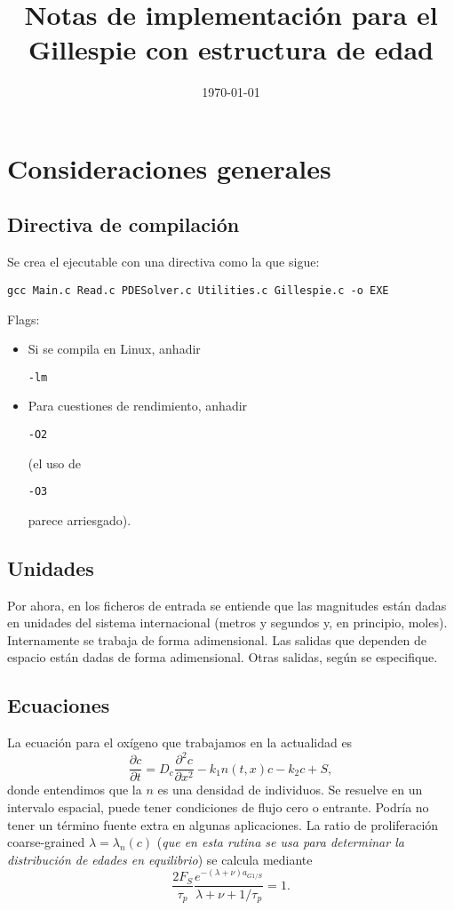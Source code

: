\documentclass[12pt]{article}
\numberwithin{equation}{section}
\begin{document}
\title{Notas de implementaci\'on para el Gillespie con estructura de edad}


\date{\today}
\maketitle


\section{Consideraciones generales}


\subsection{Directiva de compilaci\'on}
Se crea el ejecutable con una directiva como la que sigue: 
\begin{verbatim}
gcc Main.c Read.c PDESolver.c Utilities.c Gillespie.c -o EXE 
\end{verbatim}
%
Flags:
\begin{itemize}
\item Si se compila en Linux, anhadir \begin{verbatim}-lm\end{verbatim}
\item Para cuestiones de rendimiento, anhadir \begin{verbatim}-O2\end{verbatim} (el uso de \begin{verbatim}-O3\end{verbatim} parece arriesgado).
\end{itemize}
\subsection{Unidades}
Por ahora, en los ficheros de entrada se entiende que las magnitudes est\'an dadas en unidades del sistema internacional (metros y segundos y, en principio, moles). Internamente se trabaja de forma adimensional. Las salidas que dependen de espacio est\'an dadas de forma adimensional. Otras salidas, seg\'un se especifique.


\subsection{Ecuaciones}
La ecuaci\'on para el ox\'igeno que trabajamos en la actualidad es 
\begin{equation}
\label{eq:cdim}
 \frac{\partial c}{\partial t}=D_c \frac{\partial^2 c}{\partial x^2}-k_1 n(t,x)c
 -k_2c+S,
 \end{equation}
 donde entendimos que la $n$ es una densidad de individuos. Se resuelve en un intervalo espacial, puede tener condiciones de flujo cero o entrante. Podr\'ia no tener un t\'ermino fuente extra en algunas aplicaciones. La ratio de proliferaci\'on coarse-grained $\lambda=\lambda_n(c)$ ({\em que en esta rutina se usa para determinar la distribuci\'on de edades en equilibrio}) se calcula mediante
\begin{equation}
\label{eq:lambda}
 \frac{2 F_S}{\tau_p}\frac{e^{-\left(\lambda+\nu\right) a_{G1/S}}}{\lambda+\nu+1/\tau_p}=1.
\end{equation}
\end{document}
